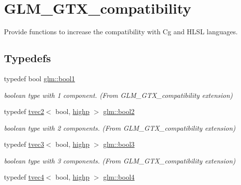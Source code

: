 \hypertarget{group__gtx__compatibility}{}\section{G\+L\+M\+\_\+\+G\+T\+X\+\_\+compatibility}
\label{group__gtx__compatibility}


Provide functions to increase the compatibility with Cg and H\+L\+SL languages.  


\subsection*{Typedefs}
\begin{DoxyCompactItemize}
\item 
typedef bool \mbox{\hyperlink{group__gtx__compatibility_gab65f19f5170f95a2f06d6aa6482c9405}{glm\+::bool1}}
\begin{DoxyCompactList}\small\item\em boolean type with 1 component. (From G\+L\+M\+\_\+\+G\+T\+X\+\_\+compatibility extension) \end{DoxyCompactList}\item 
typedef \mbox{\hyperlink{structglm_1_1tvec2}{tvec2}}$<$ bool, \mbox{\hyperlink{namespaceglm_a0f04f086094c747d227af4425893f545ac6f7eab42eacbb10d59a58e95e362074}{highp}} $>$ \mbox{\hyperlink{group__gtx__compatibility_gabe088d78d539d2a98a2a04ab798fec1a}{glm\+::bool2}}
\begin{DoxyCompactList}\small\item\em boolean type with 2 components. (From G\+L\+M\+\_\+\+G\+T\+X\+\_\+compatibility extension) \end{DoxyCompactList}\item 
typedef \mbox{\hyperlink{structglm_1_1tvec3}{tvec3}}$<$ bool, \mbox{\hyperlink{namespaceglm_a0f04f086094c747d227af4425893f545ac6f7eab42eacbb10d59a58e95e362074}{highp}} $>$ \mbox{\hyperlink{group__gtx__compatibility_gab7658aa2e0688b8ac7e640cf7e405c1e}{glm\+::bool3}}
\begin{DoxyCompactList}\small\item\em boolean type with 3 components. (From G\+L\+M\+\_\+\+G\+T\+X\+\_\+compatibility extension) \end{DoxyCompactList}\item 
typedef \mbox{\hyperlink{structglm_1_1tvec4}{tvec4}}$<$ bool, \mbox{\hyperlink{namespaceglm_a0f04f086094c747d227af4425893f545ac6f7eab42eacbb10d59a58e95e362074}{highp}} $>$ \mbox{\hyperlink{group__gtx__compatibility_ga141861edebf999f94938944f0fb0777a}{glm\+::bool4}}

\end{DoxyCompactItemize}
